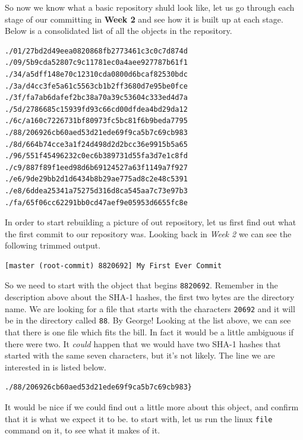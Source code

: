 So now we know what a basic repository shuld look like, let us go through each stage of our committing in \textbf{Week 2} and see how it is built up at each stage.  Below is a consolidated list of all the objects in the repository.  

\begin{Verbatim}[frame=leftline,framerule=1mm,fontsize=\relsize{-3}]
./01/27bd2d49eea0820868fb2773461c3c0c7d874d
./09/5b9cda52807c9c11781ec0a4aee927787b61f1
./34/a5dff148e70c12310cda0800d6bcaf82530bdc
./3a/d4cc3fe5a61c5563cb1b2ff3680d7e95be0fce
./3f/fa7ab6dafef2bc38a70a39c53604c333ed4d7a
./5d/2786685c15939fd93c66cd00dfdea4bd29da12
./6c/a160c7226731bf80973fc5bc81f6b9beda7795
./88/206926cb60aed53d21ede69f9ca5b7c69cb983
./8d/664b74cce3a1f24d498d2d2bcc36e9915b5a65
./96/551f45496232c0ec6b389731d55fa3d7e1c8fd
./c9/887f89f1eed98d6b69124527a63f1149a7f927
./e6/9de29bb2d1d6434b8b29ae775ad8c2e48c5391
./e8/6ddea25341a75275d316d8ca545aa7c73e97b3
./fa/65f06cc62291bb0cd47aef9e05953d6655fc8e
\end{Verbatim}

In order to start rebuilding a picture of out repository, let us first find out what the first commit to our repository was.  Looking back in \emph{Week 2} we can see the following trimmed output.

\begin{Verbatim}[frame=leftline,framerule=1mm,fontsize=\relsize{-3}]
[master (root-commit) 8820692] My First Ever Commit
\end{Verbatim}

So we need to start with the object that begins \texttt{8820692}.  Remember in the description above about the SHA-1 hashes, the first two bytes are the directory name.  We are looking for a file that starts with the characters \texttt{20692} and it will be in the directory called \texttt{88}.  By George!  Looking at the list above, we can see that there is one file which fits the bill.  In fact it would be a little ambiguous if there were two.  It \emph{could} happen that we would have two SHA-1 hashes  that started with the same seven characters, but it's not likely.  The line we are interested in is listed below.

\begin{Verbatim}[frame=leftline,framerule=1mm,fontsize=\relsize{-3}]
./88/206926cb60aed53d21ede69f9ca5b7c69cb983}
\end{Verbatim}

It would be nice if we could find out a little more about this object, and confirm that it is what we expect it to be.  to start with, let us run the linux \texttt{file} command on it, to see what it makes of it.

